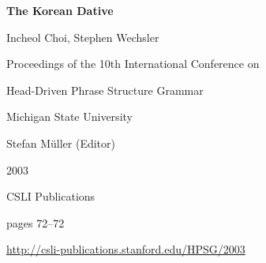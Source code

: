 \documentclass[a4paper,11pt]{article}
\begin{document}
\begin{center}
  {\huge\bf The Korean Dative\par}

  \bigskip

  {\LARGE Incheol Choi, Stephen Wechsler\par}

  \vspace*{3\bigskipamount}

  Proceedings of the 10th International Conference on\par Head-Driven Phrase Structure Grammar

  \bigskip

  Michigan State University

  \medskip

  Stefan M{\"u}ller (Editor)

  \medskip

  2003

  \medskip

  CSLI Publications

  \medskip

  pages 72--72

  \medskip

  \url{http://csli-publications.stanford.edu/HPSG/2003}
\end{center}

\newpage

        
\end{document}
